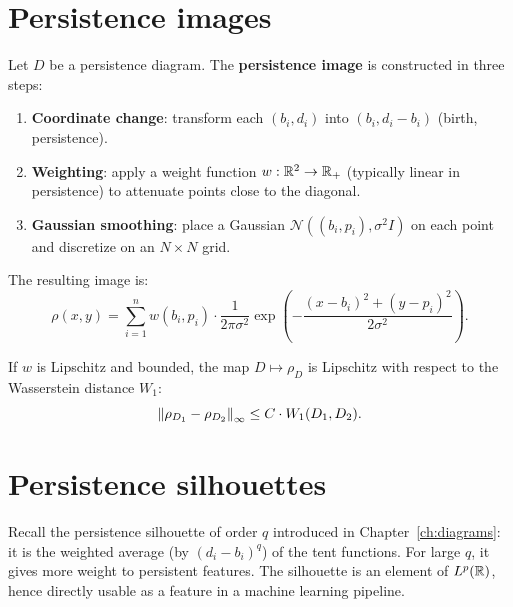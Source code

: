 \section{Persistence images}
\label{sec:images}

\begin{definition}
Let $D$ be a persistence diagram. The \textbf{persistence image}
is constructed in three steps:
\begin{enumerate}
  \item \textbf{Coordinate change}: transform each $(b_i, d_i)$
        into $(b_i, d_i - b_i)$ (birth, persistence).
  \item \textbf{Weighting}: apply a weight function
        $w : \mathbb{R}^2 \to \mathbb{R}_+$ (typically linear in persistence)
        to attenuate points close to the diagonal.
  \item \textbf{Gaussian smoothing}: place a Gaussian
        $\mathcal{N}((b_i, p_i), \sigma^2 I)$ on each point and
        discretize on an $N \times N$ grid.
\end{enumerate}
The resulting image is:
\[
  \rho(x, y) = \sum_{i=1}^n w(b_i, p_i) \cdot
  \frac{1}{2\pi\sigma^2}
  \exp\!\left(-\frac{(x - b_i)^2 + (y - p_i)^2}{2\sigma^2}\right).
\]
\end{definition}

\begin{theorem}
If $w$ is Lipschitz and bounded, the map $D \mapsto \rho_D$ is
Lipschitz with respect to the Wasserstein distance $W_1$:
\[
  \left\| \rho_{D_1} - \rho_{D_2} \right\|_\infty \leq C \cdot W_1(D_1, D_2).
\]
\end{theorem}

\section{Persistence silhouettes}
\label{sec:silhouettes}

Recall the persistence silhouette of order $q$ introduced in
Chapter~\ref{ch:diagrams}: it is the weighted average (by
$(d_i - b_i)^q$) of the tent functions. For large $q$, it gives more
weight to persistent features. The silhouette is an element of
$L^p(\mathbb{R})$, hence directly usable as a feature in a machine learning
pipeline.

